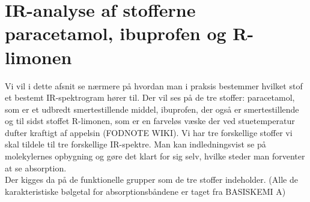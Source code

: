 \section{IR-analyse af stofferne paracetamol, ibuprofen og R-limonen}
Vi vil i dette afsnit se nærmere på hvordan man i praksis bestemmer hvilket stof et bestemt IR-spektrogram hører til. Der vil ses på de tre stoffer: paracetamol, som er et udbredt smertestillende middel, ibuprofen, der også er smertestillende og til sidst stoffet R-limonen, som er en farveløs væske der ved stuetemperatur dufter kraftigt af appelsin (FODNOTE WIKI). Vi har tre forskellige stoffer vi skal tildele til tre forskellige IR-spektre. Man kan indledningsvist se på molekylernes opbygning og gøre det klart for sig selv, hvilke steder man forventer at se absorption. 
\\

Der kigges da på de funktionelle grupper som de tre stoffer indeholder. (Alle de karakteristiske bølgetal for absorptionsbåndene er taget fra BASISKEMI A)


